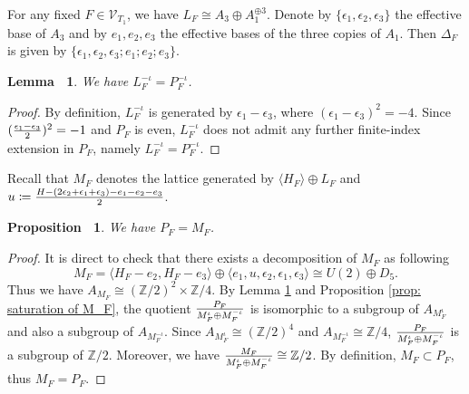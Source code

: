 \documentclass[12pt,reqno,a4paper]{amsart}
\newtheorem{lem}[thm]{Lemma~}
\newtheorem{prop}[thm]{Proposition~}
\theoremstyle{remark}
\theoremstyle{definition}
\newcommand{\ZZ}{\mathbb{Z}}
\newcommand{\PP}{\mathbb{P}}
\newcommand{\calV}{\mathcal{V}}
\newcommand{\Pic}{\mathrm{Pic}}
\begin{document}
For any fixed $F\in\calV_{T_1}$, we have $L_F\cong A_3\oplus A_1^{\oplus 3}$.
Denote by $\{\epsilon_1,\epsilon_2,\epsilon_3\}$ the effective base of $A_3$ and by $e_1,e_2,e_3$ the effective bases of the three copies of $A_1$.
Then $\Delta_F$ is given by $\{ \epsilon_1,\epsilon_2,\epsilon_3;e_1;e_2;e_3 \}$.
\begin{lem}
\label{lem: 1 A_3 + 3 A_1: L_F^-iota = P_F^-iota}
    We have $L_F^{-\iota} = P_F^{-\iota}$.
\end{lem}
\begin{proof}
    By definition, $L_F^{-\iota}$ is generated by $\epsilon_1-\epsilon_3$, where $(\epsilon_1-\epsilon_3)^2=-4$.
    Since $({\epsilon_1-\epsilon_3\over2})^2=-1$ and $P_F$ is even, $L_F^{-\iota}$ does not admit any further finite-index extension in $P_F$, namely $L_F^{-\iota} = P_F^{-\iota}$.
\end{proof}
Recall that $M_F$ denotes the lattice generated by $\langle H_F\rangle\oplus L_F$ and $u\coloneqq{H-(2\epsilon_2+\epsilon_1+\epsilon_3)-e_1-e_2-e_3\over2}$.
\begin{prop}
\label{prop: 1 A_3 + 3 A_1: P=M}
    We have $P_F=M_F$. 
\end{prop}
\begin{proof} 
    It is direct to check that there exists a decomposition of $M_F$ as following
    \begin{equation*}
        M_F = \langle H_F-e_2,H_F-e_3 \rangle \oplus \langle e_1,u,\epsilon_2,\epsilon_1,\epsilon_3 \rangle \cong U(2)\oplus D_5.
    \end{equation*}
    Thus we have $A_{M_F}\cong (\ZZ/2)^2\times\ZZ/4$.
    By Lemma \ref{lem: 1 A_3 + 3 A_1: L_F^-iota = P_F^-iota} and Proposition \ref{prop: saturation of M_F}, the quotient $P_F\over{M_F^\iota\oplus M_F^{-\iota}}$ is isomorphic to a subgroup of $A_{M_F^\iota}$ and also a subgroup of $A_{M_F^{-\iota}}$.
    Since $A_{M_F^\iota}\cong(\ZZ/2)^4$ and $A_{M_F^{-\iota}}\cong\ZZ/4$, $P_F\over{M_F^\iota\oplus M_F^{-\iota}}$ is a subgroup of $\ZZ/2$.
    Moreover, we have ${M_F\over{M_F^\iota\oplus M_F^{-\iota}}}\cong\ZZ/2$.
    By definition, $M_F\subset P_F$, thus $M_F=P_F$.
\end{proof}

\end{document}
